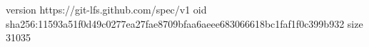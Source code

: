 version https://git-lfs.github.com/spec/v1
oid sha256:11593a51f0d49c0277ea27fae8709bfaa6aeee683066618bc1faf1f0c399b932
size 31035
